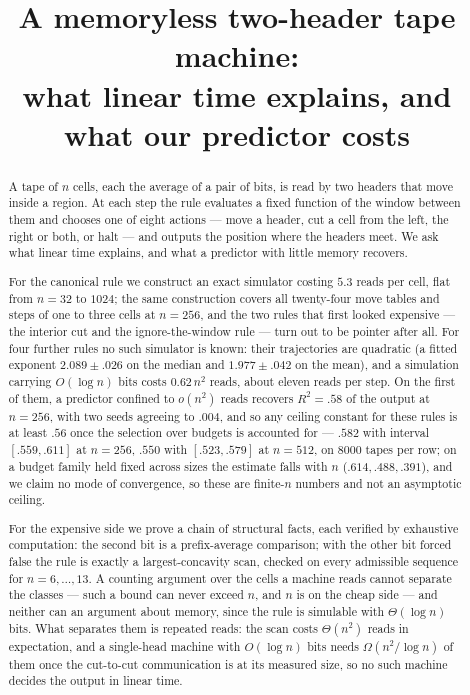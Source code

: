 \documentclass[11pt]{article}
\title{A memoryless two-header tape machine:\\
what linear time explains, and what our predictor costs}
\author{}
\date{}
\begin{document}
\maketitle

\begin{abstract}
A tape of $n$ cells, each the average of a pair of bits, is read by two headers that move inside a
region. At each step the rule evaluates a fixed function of the window between them and chooses one of
eight actions --- move a header, cut a cell from the left, the right or both, or halt --- and outputs
the position where the headers meet. We ask what linear time explains, and what a predictor with little
memory recovers.

For the canonical rule we construct an exact simulator costing $5.3$ reads per cell, flat from $n=32$
to $1024$; the same construction covers all twenty-four move tables and steps of one to three cells
at $n=256$, and the two rules that first looked expensive --- the interior cut and the
ignore-the-window rule --- turn out to be pointer after all. For four further rules no such simulator is known: their
trajectories are quadratic (a fitted exponent $2.089\pm.026$ on the median and $1.977\pm.042$ on the
mean), and a simulation carrying $O(\log n)$ bits costs $0.62\,n^2$ reads, about eleven reads per step. On the first of them, a predictor confined to $o(n^2)$ reads recovers $R^2=.58$ of the output at $n=256$, with two seeds agreeing to $.004$, and so any ceiling constant for these rules is at least $.56$ once the selection
over budgets is accounted for --- $.582$ with interval $[.559,.611]$ at $n=256$, $.550$ with
$[.523,.579]$ at $n=512$, on $8000$ tapes per row; on a budget family held fixed across sizes the
estimate falls with $n$ ($.614,.488,.391$), and we claim no mode of convergence, so these are
finite-$n$ numbers and not an asymptotic ceiling.

For the expensive side we prove a chain of structural facts, each verified by exhaustive computation: the second bit is a
prefix-average comparison; with the other bit forced false the rule is exactly a largest-concavity
scan, checked on every admissible sequence for $n=6,\dots,13$. A counting
argument over the cells a machine reads cannot separate the classes --- such a bound can never exceed $n$, and $n$ is
on the cheap side --- and neither can an argument about memory, since the rule is simulable with
$\Theta(\log n)$ bits. What separates them is repeated reads: the scan costs $\Theta(n^2)$ reads in
expectation, and a single-head machine with $O(\log n)$ bits needs $\Omega(n^2/\log n)$ of them once
the cut-to-cut communication is at its measured size, so no such machine decides the output in linear
time.

\end{abstract}
\end{document}
